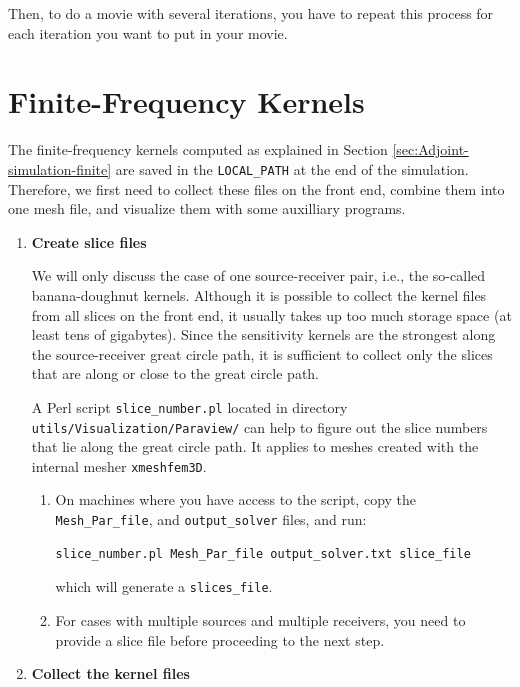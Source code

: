 \bigskip

Then, to do a movie with several iterations, you have to repeat this process for each iteration you want to put in your movie.

\section{Finite-Frequency Kernels}\label{sec:Finite-Frequency-Kernels}

The finite-frequency kernels computed as explained in Section \ref{sec:Adjoint-simulation-finite}
are saved in the \texttt{LOCAL\_PATH} at the end of the simulation.
Therefore, we first need to collect these files on the front end,
combine them into one mesh file, and visualize them with some auxilliary
programs.
\begin{enumerate}
\item \textbf{Create slice files}


We will only discuss the case of one source-receiver pair, i.e., the
so-called banana-doughnut kernels. Although it is possible to collect
the kernel files from all slices on the front end, it usually takes
up too much storage space (at least tens of gigabytes). Since the
sensitivity kernels are the strongest along the source-receiver great
circle path, it is sufficient to collect only the slices that are
along or close to the great circle path.


A Perl script \texttt{slice\_number.pl} located in directory \texttt{utils/Visualization/Paraview/}
can help to figure out the slice numbers that lie along the great
circle path. It applies to meshes created with the internal mesher
\texttt{xmeshfem3D}.
\begin{enumerate}
\item On machines where you have access to the script, copy the \texttt{Mesh\_Par\_file},
and \texttt{output\_solver} files, and run:

{\small
\begin{verbatim}
slice_number.pl Mesh_Par_file output_solver.txt slice_file
\end{verbatim}
}
which will generate a \texttt{slices\_file}.

\item For cases with multiple sources and multiple receivers, you need to
provide a slice file before proceeding to the next step.
\end{enumerate}
\item \textbf{Collect the kernel files}



\end{enumerate}
